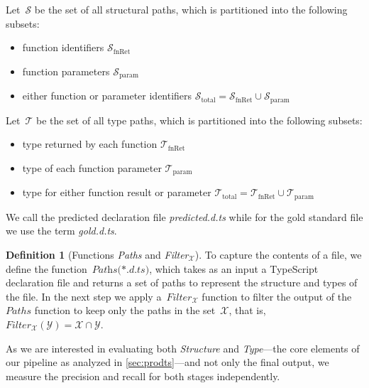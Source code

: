 \documentclass[sigplan,10pt,review,anonymous]{acmart} %
\newcommand{\margincomment}[2]{\marginpar{\scriptsize\color{Maroon}#1 says: #2}}
\newcommand{\ivp}[1]{\margincomment{IVP}{#1}}
\theoremstyle{plain}
\theoremstyle{remark}
\theoremstyle{definition}
\newtheorem{defn}{Definition}[section]
\begin{document}
Let~$\mathcal{S}$ be the set of all structural paths,
which is partitioned into the following subsets:
\begin{itemize}[label={\tiny$\bullet$}]
	\item function identifiers $\mathcal{S}_\text{fnRet}$
	\item function  parameters $\mathcal{S}_\text{param}$
	\item either function or parameter identifiers $\mathcal{S}_\text{total} = \mathcal{S}_\text{fnRet} \cup \mathcal{S}_\text{param}$
\end{itemize}

Let~$\mathcal{T}$ be the set of all type paths,
which is partitioned into the following subsets:
\begin{itemize}[label={\tiny$\bullet$}]
	\item type returned by each function $\mathcal{T}_\text{fnRet}$
	\item type of each function parameter $\mathcal{T}_\text{param}$
	\item type for either function result or parameter $\mathcal{T}_\text{total} = \mathcal{T}_\text{fnRet} \cup \mathcal{T}_\text{param}$
\end{itemize}

We call the predicted declaration file \emph{predicted.d.ts}
while for the gold standard file we use the term \emph{gold.d.ts}.

\begin{defn}[Functions \textit{Paths} and \textit{Filter$_\mathcal{X}$}]
	To capture the contents of a file, we define the
	function~$\textit{Paths(*.d.ts)}$, which takes as an input a
	TypeScript declaration file and returns a set of paths
	to represent the structure and types of the file.
	In the next step we apply a~$Filter_\mathcal{X}$ function to
	filter the output of the~$Paths$ function to keep only the paths in the set~$\mathcal{X}$,
	that is,~$Filter_\mathcal{X}(\mathcal{Y}) =  \mathcal{X} \cap \mathcal{Y}$.
\end{defn}
As we are interested in evaluating both \textit{Structure}
and \textit{Type}---the core elements of our pipeline as analyzed in \cref{sec:prodts}---and
not only the final output, we measure the precision and recall for both stages independently.
\end{document}

